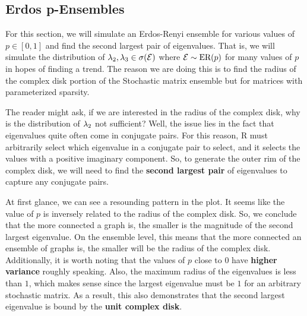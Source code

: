 \newpage

\subsection{Erdos p-Ensembles}

For this section, we will simulate an Erdos-Renyi ensemble for various values of $p \in [0,1]$ and find the second largest pair of eigenvalues.
That is, we will simulate the distribution of $\lambda_2,\lambda_3 \in \sigma(\mathcal{E})$ where $\mathcal{E} \sim \text{ER}(p)$ for many values of $p$ in hopes of finding a trend.
The reason we are doing this is to find the radius of the complex disk portion of the Stochastic matrix ensemble but for matrices with parameterized sparsity.

\begin{remark}
  The reader might ask, if we are interested in the radius of the complex disk, why is the distribution of $\lambda_2$ not sufficient? Well, the issue lies in the fact that eigenvalues quite often come in conjugate pairs. For this reason, R must arbitrarily select which eigenvalue in a conjugate pair to select, and it selects the values with a positive imaginary component. So, to generate the outer rim of the complex disk, we will need to find the \textbf{second largest pair} of eigenvalues to capture any conjugate pairs.
\end{remark}


At first glance, we can see a resounding pattern in the plot. It seems like the value of $p$ is inversely related to the radius of the complex disk. So, we conclude that the more connected a graph is, the smaller is the magnitude of the second largest eigenvalue. On the ensemble level, this means that the more connected an ensemble of graphs is, the smaller will be the radius of the complex disk. Additionally, it is worth noting that the values of $p$ close to $0$ have \textbf{higher variance} roughly speaking. Also, the maximum radius of the eigenvalues is less than $1$, which makes sense since the largest eigenvalue must be $1$ for an arbitrary stochastic matrix. As a result, this also demonstrates that the second largest eigenvalue is bound by the \textbf{unit complex disk}.

